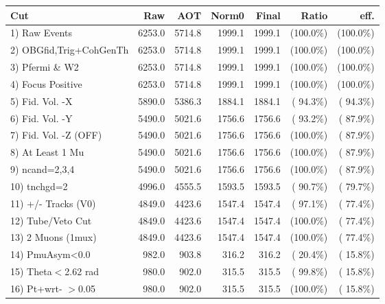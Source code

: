 \begin{table}[h!]\centering
 \begin{tabular}{||l||r|r|r|r|r|r||}
 \hline
 \hline
 Cut & Raw & AOT & Norm0 & Final & Ratio & eff.       \\
 \hline
  1) Raw Events           &       6253.0 &       5714.8 &       1999.1 &       1999.1 & (100.0\%) & (100.0\%) \\
  2) OBGfid,Trig+CohGenTh &       6253.0 &       5714.8 &       1999.1 &       1999.1 & (100.0\%) & (100.0\%) \\
  3) Pfermi \& W2         &       6253.0 &       5714.8 &       1999.1 &       1999.1 & (100.0\%) & (100.0\%) \\
  4) Focus Positive       &       6253.0 &       5714.8 &       1999.1 &       1999.1 & (100.0\%) & (100.0\%) \\
  5) Fid. Vol. -X         &       5890.0 &       5386.3 &       1884.1 &       1884.1 & ( 94.3\%) & ( 94.3\%) \\
  6) Fid. Vol. -Y         &       5490.0 &       5021.6 &       1756.6 &       1756.6 & ( 93.2\%) & ( 87.9\%) \\
  7) Fid. Vol. -Z (OFF)   &       5490.0 &       5021.6 &       1756.6 &       1756.6 & (100.0\%) & ( 87.9\%) \\
  8) At Least 1 Mu        &       5490.0 &       5021.6 &       1756.6 &       1756.6 & (100.0\%) & ( 87.9\%) \\
  9) ncand=2,3,4          &       5490.0 &       5021.6 &       1756.6 &       1756.6 & (100.0\%) & ( 87.9\%) \\
 10) tnchgd=2             &       4996.0 &       4555.5 &       1593.5 &       1593.5 & ( 90.7\%) & ( 79.7\%) \\
 11) +/- Tracks (V0)      &       4849.0 &       4423.6 &       1547.4 &       1547.4 & ( 97.1\%) & ( 77.4\%) \\
 12) Tube/Veto Cut        &       4849.0 &       4423.6 &       1547.4 &       1547.4 & (100.0\%) & ( 77.4\%) \\
 13) 2 Muons (1mux)       &       4849.0 &       4423.6 &       1547.4 &       1547.4 & (100.0\%) & ( 77.4\%) \\
 14) PmuAsym<0.0          &        982.0 &        903.8 &        316.2 &        316.2 & ( 20.4\%) & ( 15.8\%) \\
 15) Theta$<$2.62 rad     &        980.0 &        902.0 &        315.5 &        315.5 & ( 99.8\%) & ( 15.8\%) \\
 16) Pt+wrt- $>$0.05      &        980.0 &        902.0 &        315.5 &        315.5 & (100.0\%) & ( 15.8\%) \\

\end{tabular}
\end{table}
